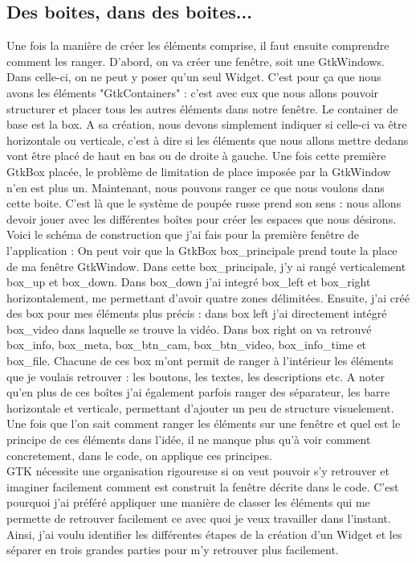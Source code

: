 \documentclass[11pt,french,a4paper]{report}
\begin{document}
        \subsection{Des boites, dans des boites...}
Une fois la manière de créer les éléments comprise, il faut ensuite comprendre comment les ranger. D'abord, on va créer une fenêtre, soit une GtkWindows. Dans celle-ci, on 
ne peut y poser qu'un seul Widget. C'est pour ça que nous avons les éléments "GtkContainers" : c'est avec eux que nous allons pouvoir structurer et placer tous les autres 
éléments dans notre fenêtre. Le container de base est la box. A sa création, nous devons simplement indiquer si celle-ci va être horizontale ou verticale, c'est à dire
si les éléments que nous allons mettre dedans vont être placé de haut en bas ou de droite à gauche. Une fois cette première GtkBox placée, le problème de limitation de place 
imposée par la GtkWindow n'en est plus un. Maintenant, nous pouvons ranger ce que nous voulons dans cette boite. C'est là que le système de poupée russe prend son sens : 
nous allons devoir jouer avec les différentes boîtes pour créer les espaces que nous désirons. Voici le schéma de construction que j'ai fais pour la première fenêtre de 
l'application : 
On peut voir que la GtkBox box\_principale prend toute la place de ma fenêtre GtkWindow. Dans cette box\_principale, j'y ai rangé verticalement box\_up et box\_down. Dans
box\_down j'ai integré box\_left et box\_right horizontalement, me permettant d'avoir quatre zones délimitées. Ensuite, j'ai créé des box pour mes éléments plus précis :
dans box left j'ai directement intégré box\_video dans laquelle se trouve la vidéo. Dans box right on va retrouvé box\_info, box\_meta, box\_btn\_cam, box\_btn\_video, 
box\_info\_time et box\_file. Chacune de ces box m'ont permit de ranger à l'intérieur les éléments que je voulais retrouver : les boutons, les textes, les descriptions etc. 
A noter qu'en plus de ces boîtes j'ai également parfois ranger des séparateur, les barre horizontale et verticale, permettant d'ajouter un peu de structure visuelement. \\
Une fois que l'on sait comment ranger les éléments sur une fenêtre et quel est le principe de ces éléments dans l'idée, il ne manque plus qu'à voir comment concretement, 
dans le code, on applique ces principes. \\   
GTK nécessite une organisation rigoureuse si on veut pouvoir s'y retrouver et imaginer facilement comment est construit la fenêtre décrite dans le code. 
C'est pourquoi j'ai préféré appliquer une manière de classer les éléments qui me permette de retrouver facilement ce avec quoi je veux travailler dans l'instant. \\
Ainsi, j'ai voulu identifier les différentes étapes de la création d'un Widget et les séparer en trois grandes parties pour m'y retrouver plus facilement. \\
\end{document}
